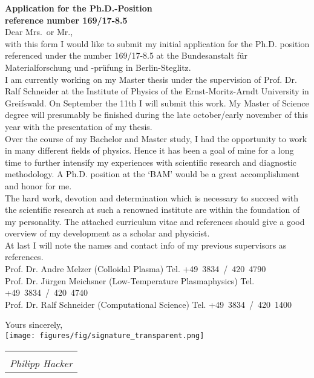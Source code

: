 \documentclass[11pt,a4paper]{moderncv}
\makeatletter
\newcommand{\sign}[1]{%
  \begin{tabular}[t]{@{}l@{}}
  \makebox[1.5in]{\dotfill}\\
  \strut\emph{#1}\strut%
  \end{tabular}%
}
\makeatother
\begin{document}
	\vspace*{1.0cm}
	{\bfseries \color{familynamecolor}%
		Application for the Ph.D.-Position\\
		reference number 169/17-8.5
	}\\[0.75cm]
%
	Dear Mrs.\ or Mr.,\\[0.5cm]
%	
	with this form I would like to submit my initial application for the Ph.D. position referenced under the number 169/17-8.5 at the Bundesanstalt für Materialforschung und -prüfung in Berlin-Steglitz.\\[0.3cm]
%
		I am currently working on my Master thesis under the supervision of Prof. Dr. Ralf Schneider at the Institute of Physics of the Ernst-Moritz-Arndt University in Greifswald. On September the 11th I will submit this work. My Master of Science degree will presumably be finished during the late october/early november of this year with the presentation of my thesis.\\[0.3cm] 
%
		Over the course of my Bachelor and Master study, I had the opportunity to work in many different fields of physics. Hence it has been a goal of mine for a long time to further intensify my experiences with scientific research and diagnostic methodology. A Ph.D. position at the `BAM' would be a great accomplishment and honor for me.\\[0.3cm]
%
		The hard work, devotion and determination which is necessary to succeed with the scientific research at such a renowned institute are within the foundation of my personality. The attached curriculum vitae and references should give a good overview of my development as a scholar and physicist.\\[0.3cm]
%		
		At last I will note the names and contact info of my previous supervisors as references.\\[0.3cm]
		\hspace*{0.5cm}Prof. Dr. Andre Melzer (Colloidal Plasma)%
			\hfill Tel. +49~3834~/~420~4790\\
		\hspace*{0.5cm}Prof. Dr. Jürgen Meichsner (Low-Temperature Plasmaphysics)%
			\hfill Tel. +49~3834~/~420~4740\\
		\hspace*{0.5cm}Prof. Dr. Ralf Schneider (Computational Science)%
			\hfill Tel. +49~3834~/~420~1400\\
%
	\vspace*{0.3cm}
	\begin{flushleft}
		Yours sincerely,\\[0.75cm]
		\vspace*{-1.0cm}%
		\texttt{[image: figures/fig/signature\_transparent.png]}
		\hspace*{-4.0cm}\sign{Philipp Hacker}\\[0.0cm]
	\end{flushleft}
%
	\newpage
	\pagestyle{fancy}
\end{document}
